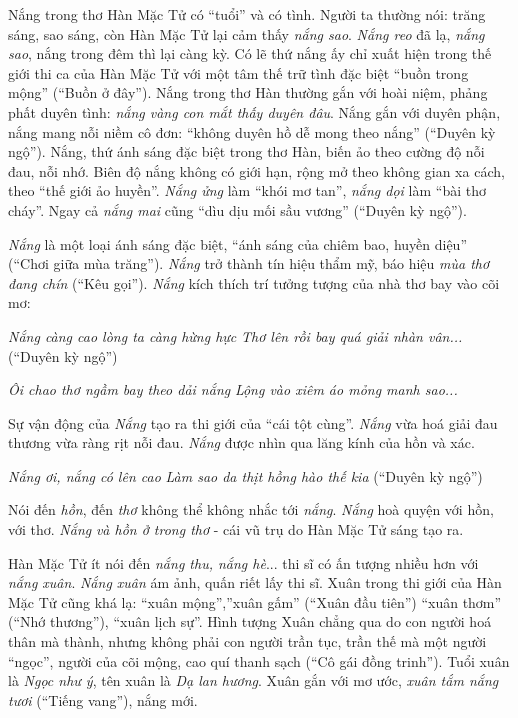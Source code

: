 \documentclass[../main.tex]{subfiles}
\begin{document}
\begin{multicols}{2}
Nắng trong thơ Hàn Mặc Tử có “tuổi” và có tình. Người ta thường nói: trăng sáng, sao sáng, còn Hàn Mặc Tử lại cảm thấy \textit{nắng sao}. \textit{Nắng reo} đã lạ, \textit{nắng sao}, nắng trong đêm thì lại càng kỳ. Có lẽ thứ nắng ấy chỉ xuất hiện trong thế giới thi ca của Hàn Mặc Tử với một tâm thế trữ tình đặc biệt “buồn trong mộng” (“Buồn ở đây”). Nắng trong thơ Hàn thường gắn với hoài niệm, phảng phất duyên tình: \textit{nắng vàng con mắt thấy duyên đâu}. Nắng gắn với duyên phận, nắng mang nỗi niềm cô đơn: “không duyên hồ dễ mong theo nắng” (“Duyên kỳ ngộ”). Nắng, thứ ánh sáng đặc biệt trong thơ Hàn, biến ảo theo cường độ nỗi đau, nỗi nhớ. Biên độ nắng không có giới hạn, rộng mở theo không gian xa cách, theo “thế giới ảo huyền”. \textit{Nắng ửng} làm “khói mơ tan”, \textit{nắng dọi} làm “bài thơ cháy”. Ngay cả \textit{nắng mai} cũng “dìu dịu mối sầu vương” (“Duyên kỳ ngộ”). 
 
\textit{Nắng }là một loại ánh sáng đặc biệt, “ánh sáng của chiêm bao, huyền diệu” (“Chơi giữa mùa trăng”). \textit{Nắng} trở thành tín hiệu thẩm mỹ, báo hiệu \textit{mùa thơ đang chín} (“Kêu gọi”). \textit{Nắng} kích thích trí tưởng tượng của nhà thơ bay vào cõi mơ:  
 
\textit{Nắng càng cao lòng ta càng hừng hực} 
\textit{Thơ lên rồi bay quá giải nhàn vân...} 
(“Duyên kỳ ngộ”) 
 
\textit{Ôi chao thơ ngầm bay theo dải nắng} 
\textit{Lộng vào xiêm áo mỏng manh sao...} 
 
Sự vận động của \textit{Nắng} tạo ra thi giới của “cái tột cùng”. \textit{Nắng} vừa hoá giải đau thương vừa ràng rịt nỗi đau. \textit{Nắng} được nhìn qua lăng kính của hồn và xác. 
 
\textit{Nắng ơi, nắng có lên cao} 
\textit{Làm sao da thịt hồng hào thế kia} 
(“Duyên kỳ ngộ”) 
 
Nói đến \textit{hồn}, đến \textit{thơ }không thể không nhắc tới \textit{nắng}. \textit{Nắng} hoà quyện với hồn, với thơ. \textit{Nắng} \textit{và hồn ở trong thơ} - cái vũ trụ do Hàn Mặc Tử sáng tạo ra.  
 
Hàn Mặc Tử ít nói đến \textit{nắng thu, nắng hè}... thi sĩ có ấn tượng nhiều hơn với \textit{nắng xuân}. \textit{Nắng xuân} ám ảnh, quấn riết lấy thi sĩ. Xuân trong thi giới của Hàn Mặc Tử cũng khá lạ: “xuân mộng”,”xuân gấm” (“Xuân đầu tiên”) “xuân thơm” (“Nhớ thương”), “xuân lịch sự”. Hình tượng Xuân chẳng qua do con người hoá thân mà thành, nhưng không phải con người trần tục, trần thế mà một người “ngọc”, người của cõi mộng, cao quí thanh sạch (“Cô gái đồng trinh”). Tuổi xuân là \textit{Ngọc như ý}, tên xuân là \textit{Dạ lan hương}. Xuân gắn với mơ ước, \textit{xuân tắm nắng tươi} (“Tiếng vang”), nắng mới.        
 

\end{multicols}
\end{document}
